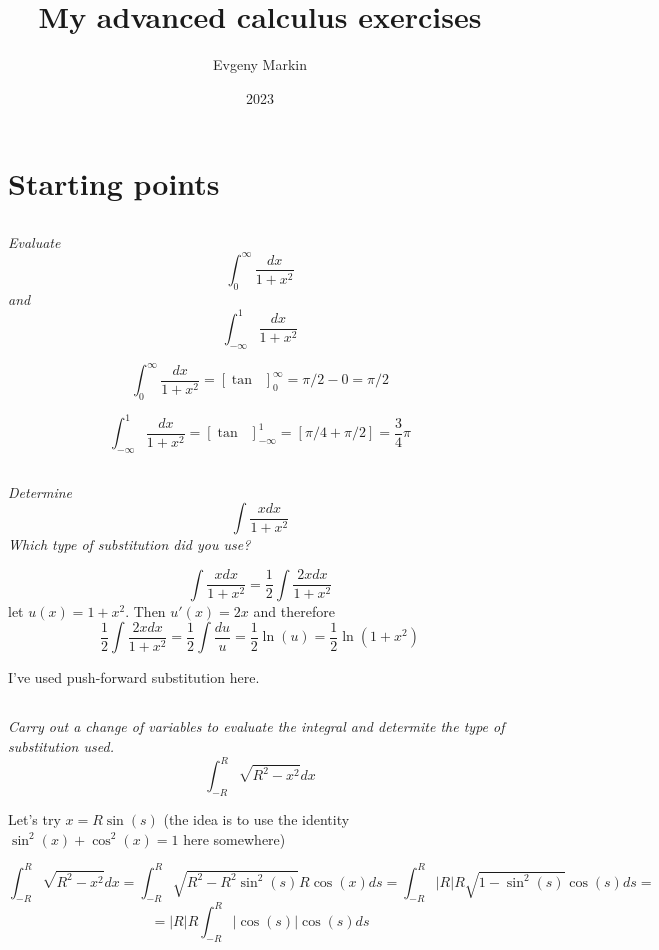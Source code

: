 \documentclass[11pt,oneside,titlepage]{book}
\title{My advanced calculus exercises}
\author{Evgeny Markin}
\date{2023}
\DeclareMathOperator \inv {^{-1}}
\begin{document}
\maketitle
\tableofcontents


\chapter{Starting points}

\section{}

\textit{Evaluate }
$$\int_0^\infty{\frac{dx}{1 + x^2}}$$
\textit{and}
$$\int_{-\infty}^1{\frac{dx}{1 + x^2}}$$

$$\int_0^\infty{\frac{dx}{1 + x^2}} = [\tan \inv]_0^\infty = \pi/2 - 0 = \pi/2 $$

$$\int_{-\infty}^1{\frac{dx}{1 + x^2}} = [\tan \inv]_{-\infty}^1 = [\pi/4 + \pi/2] = \frac{3}{4} \pi$$


\section{}

\textit{Determine}
$$\int{\frac {x dx}{1 + x^2}}$$
\textit{Which type of substitution did you use?}

$$\int{\frac {x dx}{1 + x^2}} = \frac 1 2 \int{ \frac {2 x  dx}{1 + x^2}}$$
let $u(x) = 1 + x^2$. Then $u'(x) = 2x$ and therefore
$$\frac 1 2 \int{ \frac {2 x  dx}{1 + x^2}} =
\frac 1 2 \int{ \frac {du}{u}} = \frac{1}{2} \ln(u) = \frac{1}{2} \ln(1 + x^2)$$

I've used push-forward substitution here.

\section{}

\textit{Carry out a change of variables to evaluate the integral and determite the type
of substitution used.}
$$\int_{-R}^{R}{\sqrt{R^2 - x^2}dx}$$



Let's try $x = R \sin(s)$ (the idea is to use the identity $\sin^2(x) + \cos^2(x) = 1$ here
somewhere)

$$\int_{-R}^{R}{\sqrt{R^2 - x^2}dx} =
\int_{-R}^{R}{\sqrt{R^2 - R^2 \sin^2(s)} R\cos(x) ds} =
\int_{-R}^{R}{|R|R \sqrt{1 -  \sin^2(s)} \cos(s) ds} =$$
$$ = 
|R|R  \int_{-R}^{R}{|\cos(s)| \cos(s) ds}
$$
\end{document}
